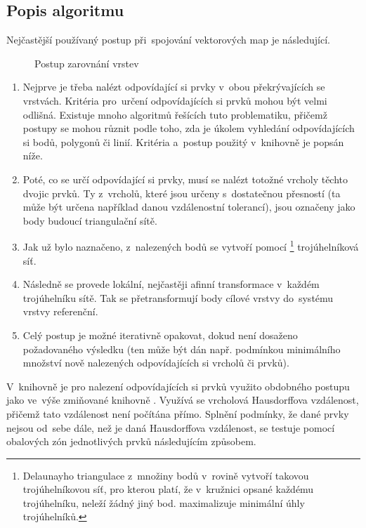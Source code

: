 \subsection{Popis algoritmu}
\label{ca-algoritmus}

Nejčastější používaný postup při~spojování vektorových map je následující.

  \begin{figure}[H]
    \centering
      
      \caption{Postup zarovnání vrstev}
      \label{fig:ca-princip}
  \end{figure}

\begin{enumerate}
 \item Nejprve je třeba nalézt odpovídající si prvky v~obou překrývajících se 
    vrstvách. Kritéria pro~určení odpovídajících si prvků mohou být velmi 
    odlišná. Existuje mnoho algoritmů řešících tuto problematiku, přičemž 
    postupy se mohou různit podle toho, zda je úkolem vyhledání 
    odpovídajících si bodů, polygonů či linií. Kritéria a~postup použitý 
    v~knihovně  je popsán níže.
 \item Poté, co se určí odpovídající si prvky, musí se nalézt totožné vrcholy 
    těchto dvojic prvků. Ty z~vrcholů, které jsou určeny s~dostatečnou 
    přesností (ta může být určena například danou vzdálenostní tolerancí), 
    jsou označeny jako body budoucí triangulační sítě.
 \item Jak už bylo naznačeno, z~nalezených bodů se vytvoří pomocí 
    \footnote{Delaunayho triangulace z~množiny bodů v~rovině 
    vytvoří takovou trojúhelníkovou síť, pro kterou platí, že v~kružnici 
    opsané každému trojúhelníku, neleží žádný jiný bod.  maximalizuje
    minimální úhly trojúhelníků.} trojúhelníková síť. 
 \item Následně se provede lokální, nejčastěji afinní transformace v~každém 
    trojúhelníku sítě. Tak se přetransformují body cílové vrstvy do~systému 
    vrstvy referenční.
 \item Celý postup je možné iterativně opakovat, dokud není dosaženo 
    požadovaného výsledku (ten může být dán např. podmínkou minimálního 
    množství nově nale\-zených odpovídajících si vrcholů či prvků).
\end{enumerate}

V~knihovně  je pro nalezení odpovídajících si prvků využito 
obdobného postupu jako ve~výše zmiňované knihovně . Využívá 
se vrcholová Hausdorffova vzdálenost, přičemž tato vzdálenost není počítána 
přímo. Splnění podmínky, že dané prvky nejsou od~sebe dále, než je daná 
Hausdorffova vzdálenost, se testuje pomocí obalových zón jednotlivých prvků 
následujícím způsobem.

